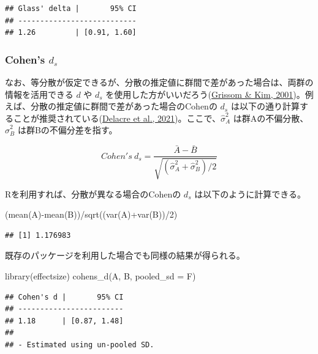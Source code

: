 \documentclass[
  ja=standard, xelatex, base=12pt]{bxjsreport}
\newenvironment{Shaded}{\begin{snugshade}}{\end{snugshade}}
\newcommand{\AttributeTok}[1]{\textcolor[rgb]{0.77,0.63,0.00}{#1}}
\newcommand{\DecValTok}[1]{\textcolor[rgb]{0.00,0.00,0.81}{#1}}
\newcommand{\FunctionTok}[1]{\textcolor[rgb]{0.00,0.00,0.00}{#1}}
\newcommand{\NormalTok}[1]{#1}
\newcommand{\SpecialCharTok}[1]{\textcolor[rgb]{0.00,0.00,0.00}{#1}}
\begin{document}
\begin{verbatim}
## Glass' delta |       95% CI
## ---------------------------
## 1.26         | [0.91, 1.60]
\end{verbatim}

\hypertarget{cohens-d_s-3}{%
\subsubsection{\texorpdfstring{Cohen's \(d_s\)}{Cohen's d\_s}}\label{cohens-d_s-3}}

なお、等分散が仮定できるが、分散の推定値に群間で差があった場合は、両群の情報を活用できる \(d\) や \(d_s\) を使用した方がいいだろう(\protect\hyperlink{ref-grissom2001}{Grissom \& Kim, 2001})。例えば、分散の推定値に群間で差があった場合のCohenの \(d_s\) は以下の通り計算することが推奨されている(\protect\hyperlink{ref-delacre2021}{Delacre et al., 2021})。ここで、\(\hat\sigma_A^2\) は群Aの不偏分散、\(\hat\sigma_B^2\) は群Bの不偏分差を指す。

\[
Cohen's~d_s=\frac{\bar{A}-\bar{B}}{\sqrt{(\hat\sigma_A^2+\hat\sigma_B^2)/2}}
\]

Rを利用すれば、分散が異なる場合のCohenの \(d_s\) は以下のように計算できる。

\begin{Shaded}
\begin{Highlighting}[]
\NormalTok{(}\FunctionTok{mean}\NormalTok{(A)}\SpecialCharTok{{-}}\FunctionTok{mean}\NormalTok{(B))}\SpecialCharTok{/}\FunctionTok{sqrt}\NormalTok{((}\FunctionTok{var}\NormalTok{(A)}\SpecialCharTok{+}\FunctionTok{var}\NormalTok{(B))}\SpecialCharTok{/}\DecValTok{2}\NormalTok{)}
\end{Highlighting}
\end{Shaded}

\begin{verbatim}
## [1] 1.176983
\end{verbatim}

既存のパッケージを利用した場合でも同様の結果が得られる。

\begin{Shaded}
\begin{Highlighting}[]
\FunctionTok{library}\NormalTok{(effectsize)}
\FunctionTok{cohens\_d}\NormalTok{(A, B, }\AttributeTok{pooled\_sd =}\NormalTok{ F)}
\end{Highlighting}
\end{Shaded}

\begin{verbatim}
## Cohen's d |       95% CI
## ------------------------
## 1.18      | [0.87, 1.48]
## 
## - Estimated using un-pooled SD.
\end{verbatim}
\end{document}
